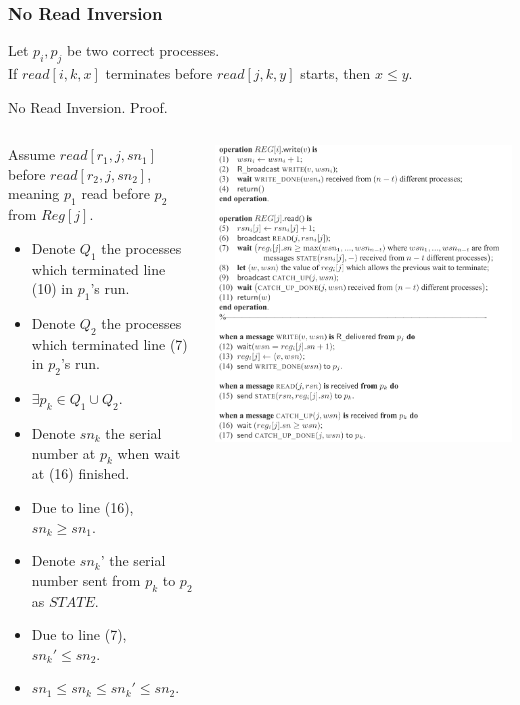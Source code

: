 \begin{frame}
    \frametitle{No Read Inversion}
    \begin{lemma}
        Let $p_i, p_j$ be two correct processes.\\
        If $read[i,k,x]$ terminates before $read[j,k,y]$ starts, then $x\leq y$.
    \end{lemma}
\end{frame}
\begin{frame}{No Read Inversion. Proof.}
    \begin{columns}[T]
        \begin{column}{.5\textwidth}
            Assume $read[r_1,j,sn_1]$ before $read[r_2,j,sn_2]$, meaning $p_1$ read
            before $p_2$ from $Reg[j]$.
            \begin{itemize}
                \item Denote $Q_1$ the processes which terminated line (10) in $p_1$'s run.
                \item Denote $Q_2$ the processes which terminated line (7) in $p_2$'s run.
                \item $\exists p_k\in Q_1\cup Q_2$.
                \item Denote $sn_k$ the serial number at $p_k$ when wait at (16) finished.
                \item Due to line (16), $sn_k\geq sn_1$.
                \item Denote $sn_k$' the serial number sent from $p_k$ to $p_2$ as $STATE$.
                \item Due to line (7), $sn_k'\leq sn_2$.
                \item $sn_1\leq sn_k\leq sn_k'\leq sn_2$.
            \end{itemize}
        \end{column}
        \begin{column}{.5\textwidth}
            \includegraphics[scale=.465]{resources/mainalg.png}

\end{column}
\end{columns}
\end{frame}
